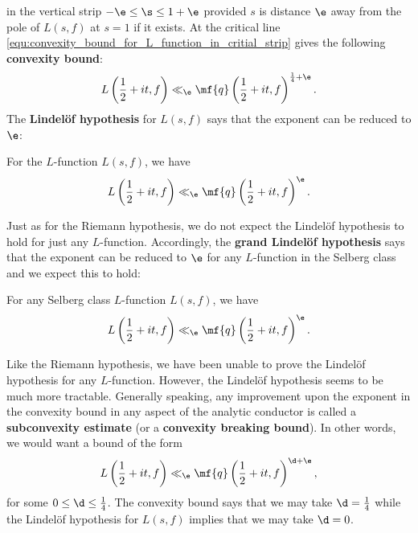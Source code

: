     in the vertical strip $-\e \le \s \le 1+\e$ provided $s$ is distance $\e$ away from the pole of $L(s,f)$ at $s = 1$ if it exists. At the critical line \cref{equ:convexity_bound_for_L_function_in_critial_strip} gives the following \textbf{convexity bound}:
    \begin{equation}\label{equ:convexity_bound_L_function}
      L\left(\frac{1}{2}+it,f\right) \ll_{\e} \mf{q}\left(\frac{1}{2}+it,f\right)^{\frac{1}{4}+\e}.
    \end{equation}
    The \textbf{Lindel\"of hypothesis} for $L(s,f)$ says that the exponent can be reduced to $\e$:

    \begin{conjecture}
      For the $L$-function $L(s,f)$, we have
      \[
        L\left(\frac{1}{2}+it,f\right) \ll_{\e} \mf{q}\left(\frac{1}{2}+it,f\right)^{\e}.
      \]
    \end{conjecture}

    Just as for the Riemann hypothesis, we do not expect the Lindel\"of hypothesis to hold for just any $L$-function. Accordingly, the \textbf{grand Lindel\"of hypothesis} says that the exponent can be reduced to $\e$ for any $L$-function in the Selberg class and we expect this to hold:

    \begin{conjecture}
      For any Selberg class $L$-function $L(s,f)$, we have
      \[
        L\left(\frac{1}{2}+it,f\right) \ll_{\e} \mf{q}\left(\frac{1}{2}+it,f\right)^{\e}.
      \]
    \end{conjecture}

    Like the Riemann hypothesis, we have been unable to prove the Lindel\"of hypothesis for any $L$-function. However, the Lindel\"of hypothesis seems to be much more tractable. Generally speaking, any improvement upon the exponent in the convexity bound in any aspect of the analytic conductor is called a \textbf{subconvexity estimate} (or a \textbf{convexity breaking bound}). In other words, we would want a bound of the form
    \[
      L\left(\frac{1}{2}+it,f\right) \ll_{\e} \mf{q}\left(\frac{1}{2}+it,f\right)^{\d+\e},
    \]
    for some $0 \le \d \le \frac{1}{4}$. The convexity bound says that we may take $\d = \frac{1}{4}$ while the Lindel\"of hypothesis for $L(s,f)$ implies that we may take $\d = 0$.

